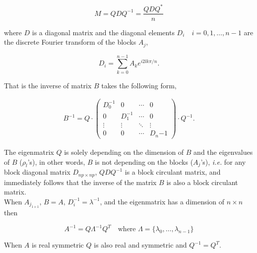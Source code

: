 \[
M = QDQ^{-1} = \frac{QDQ^*}{n}
\]

\noi where $D$ is a diagonal matrix and the diagonal elements $D_i \quad i=0,1,\ldots, n-1$ are the discrete Fourier transform of the blocks $A_j$,

\[
D_i = \sum_{k=0}^{n-1} A_k e^{i2lk\pi/n}.
\]

That is the inverse of matrix $B$ takes the following form,

\begin{eqnarray*}
	B^{-1} = Q\cdot\left(
		\begin{array}{llll}
			D_0^{-1}  & 0              & \cdots & 0 \\
			0         & D_1^{-1}       & \cdots & 0 \\
			\vdots    & \vdots         & \ddots & \vdots  \\
			0         & 0              & \cdots & D_n{-1}
		\end{array}
	\right)\cdot Q^{-1}.
\end{eqnarray*}

The eigenmatrix $Q$ is solely depending on the dimension of $B$ and the eigenvalues of $B$ ($\rho_l$'s), in other words, $B$ is not depending on the blocks ($A_j$'s), {\em i.e.} for any block diagonal matrix $D_{np \times np}$, $QDQ^{-1}$ is a block circulant matrix, and immediately follows that the inverse of the matrix $B$ is also a block circulant matrix.\\

When $A_{j_{1\times 1}}$, $B=A$, $D_i^{-1}=\lambda^{-1}$, and the eigenmatrix has a dimension of $n\times n$ then

\[
A^{-1} = Q \Lambda^{-1} Q^T \quad \mbox{where $\Lambda = \{\lambda_0, \ldots, \lambda_{n-1} \}$}
\]

When $A$ is real symmetric $Q$ is also real and symmetric and $Q^{-1}=Q^T$.\\





